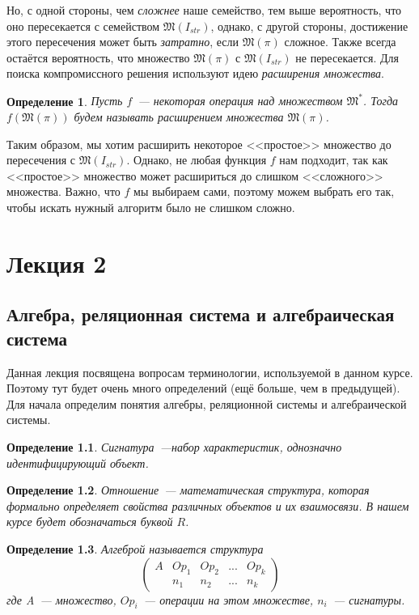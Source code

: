 \documentclass[a4paper, 12pt]{report}
\newtheorem{definition}{Определение}[chapter]
\begin{document}
Но, с одной стороны, чем \emph{сложнее} наше семейство, тем выше вероятность, что оно пересекается с семейством $\mathfrak{M}(I_{str})$, однако, с другой стороны, достижение этого пересечения может быть \emph{затратно}, если $\mathfrak{M}(\pi)$ сложное. Также всегда остаётся вероятность, что множество $\mathfrak{M}(\pi)$ с $\mathfrak{M}(I_{str})$ не пересекается. Для поиска компромиссного решения используют идею \emph{расширения множества}.

\begin{definition}
Пусть $f$~--- некоторая операция над множеством $\mathfrak{M}^*$. Тогда $f(\mathfrak{M}(\pi))$ будем называть расширением множества $\mathfrak{M}(\pi)$.
\end{definition}

Таким образом, мы хотим расширить некоторое <<простое>> множество до пересечения с $\mathfrak{M}(I_{str})$. Однако, не любая функция $f$ нам подходит, так как <<простое>> множество может расшириться до слишком <<сложного>> множества. Важно, что $f$ мы выбираем сами, поэтому можем выбрать его так, чтобы искать нужный алгоритм было не слишком сложно.

\chapter{Лекция 2}
\section{Алгебра, реляционная система и алгебраическая система}
Данная лекция посвящена вопросам терминологии, используемой в данном курсе. Поэтому тут будет очень много определений (ещё больше, чем в предыдущей). Для начала определим понятия алгебры, реляционной системы и алгебраической системы.

\begin{definition}
Сигнатура~---набор характеристик, однозначно идентифицирующий объект.
\end{definition}

\begin{definition}
Отношение~--- математическая структура, которая формально определяет свойства различных объектов и их взаимосвязи. В нашем курсе будет обозначаться буквой $R$.
\end{definition}

\begin{definition}
Алгеброй называется структура
\[
\left(
\begin{array}{ccccc}
  A & Op_1 & Op_2 & ... & Op_k \\
    & n_1 & n_2 & ... & n_k
\end{array}
\right)
\]
где A~--- множество, $Op_i$~--- операции на этом множестве, $n_i$~--- сигнатуры.
\end{definition}
\end{document}

